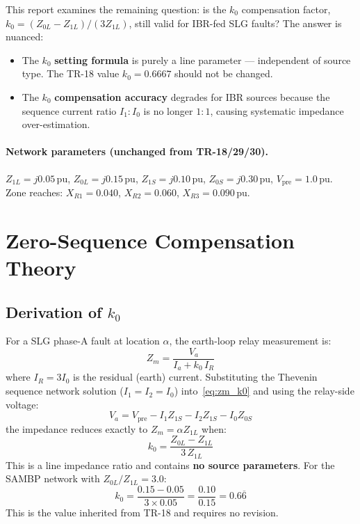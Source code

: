 \documentclass[11pt,a4paper]{article}
\begin{document}
This report examines the remaining question: is the $k_0$ compensation factor,
$k_0 = (Z_{0L}-Z_{1L})/(3Z_{1L})$, still valid for IBR-fed SLG faults?  The
answer is nuanced:
\begin{itemize}
  \item The $k_0$ \textbf{setting formula} is purely a line parameter ---
        independent of source type.  The TR-18 value $k_0 = 0.6667$ should not
        be changed.
  \item The $k_0$ \textbf{compensation accuracy} degrades for IBR sources because
        the sequence current ratio $I_1 : I_0$ is no longer $1:1$, causing
        systematic impedance over-estimation.
\end{itemize}

\paragraph{Network parameters (unchanged from TR-18/29/30).}
$Z_{1L}=j0.05$\,pu, $Z_{0L}=j0.15$\,pu, $Z_{1S}=j0.10$\,pu,
$Z_{0S}=j0.30$\,pu, $V_\mathrm{pre}=1.0$\,pu.
Zone reaches: $X_{R1}=0.040$, $X_{R2}=0.060$, $X_{R3}=0.090$\,pu.

\section{Zero-Sequence Compensation Theory}
\label{sec:theory}

\subsection{Derivation of \texorpdfstring{$k_0$}{k0}}

For a SLG phase-A fault at location $\alpha$, the earth-loop relay measurement is:
\begin{equation}
  Z_m = \frac{V_a}{I_a + k_0\,I_R}
  \label{eq:zm_k0}
\end{equation}
where $I_R = 3I_0$ is the residual (earth) current.  Substituting the Thevenin
sequence network solution ($I_1 = I_2 = I_0$) into~\eqref{eq:zm_k0} and using
the relay-side voltage:
\begin{equation}
  V_a = V_\mathrm{pre} - I_1 Z_{1S} - I_2 Z_{1S} - I_0 Z_{0S}
  \label{eq:va_relay}
\end{equation}
the impedance reduces exactly to $Z_m = \alpha Z_{1L}$ when:
\begin{equation}
  \boxed{k_0 = \frac{Z_{0L} - Z_{1L}}{3\,Z_{1L}}}
  \label{eq:k0}
\end{equation}
This is a line impedance ratio and contains \textbf{no source parameters}.  For
the SAMBP network with $Z_{0L}/Z_{1L} = 3.0$:
\begin{equation}
  k_0 = \frac{0.15 - 0.05}{3 \times 0.05} = \frac{0.10}{0.15} = 0.6\overline{6}
  \label{eq:k0_value}
\end{equation}
This is the value inherited from TR-18 and requires no revision.
\end{document}
